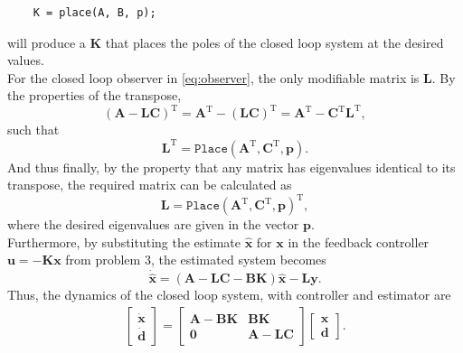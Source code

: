 \begin{verbatim}
    K = place(A, B, p);
\end{verbatim}
will produce a $\mathbf{K}$ that places the poles of the closed loop system at the desired values. \cite{MathWorks2018}\\
For the closed loop observer in \eqref{eq:observer}, the only modifiable matrix is $\mathbf{L}$. By the properties of the transpose, 
\begin{equation*}
    (\mathbf{A} - \mathbf{LC})^\text{T} = \mathbf{A}^\text{T} - (\mathbf{LC})^\text{T} = \mathbf{A}^\text{T} - \mathbf{C}^\text{T} \mathbf{L}^\text{T},
\end{equation*}
such that
\begin{equation*}
    \mathbf{L}^\text{T} = \texttt{Place}(\mathbf{A}^\text{T}, \mathbf{C}^\text{T}, \mathbf{p}).
\end{equation*}
And thus finally, by the property that any matrix has eigenvalues identical to its transpose, the required matrix can be calculated as
\begin{equation}
    \label{eq:est_pole_place}
    \mathbf{L} = \texttt{Place}(\mathbf{A}^\text{T}, \mathbf{C}^\text{T}, \mathbf{p})^\text{T},
\end{equation}
where the desired eigenvalues are given in the vector $\mathbf{p}$.\\
Furthermore, by substituting the estimate $\mathbf{\hat{x}}$ for $\mathbf{x}$ in the feedback controller $\mathbf{u} = -\mathbf{Kx}$ from problem 3, the estimated system becomes
\begin{equation}
    \mathbf{\dot{\hat{x}}} = (\mathbf{A} - \mathbf{LC} - \mathbf{BK})\mathbf{\hat{x}} - \mathbf{L} \mathbf{y}.
\end{equation}
Thus, the dynamics of the closed loop system, with controller and estimator are 
\begin{align}
    \begin{bmatrix}
    \mathbf{\dot{x}} \\
        \mathbf{\dot{d}}
        \end{bmatrix}
    = \begin{bmatrix}
        \mathbf{A} - \mathbf{BK} & \mathbf{BK} \\
        \mathbf{0}               & \mathbf{A} - \mathbf{LC}
    \end{bmatrix}
    \begin{bmatrix}
        \mathbf{x} \\
        \mathbf{d}
    \end{bmatrix}.
\end{align}
